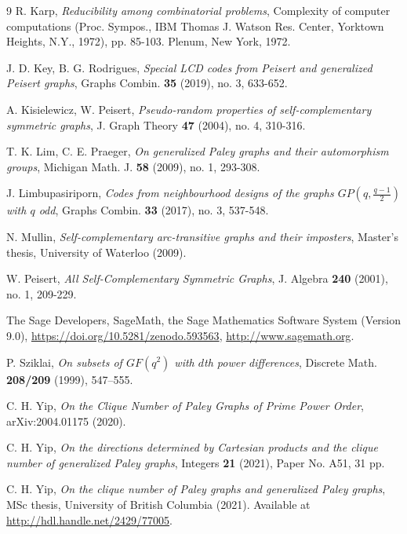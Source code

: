 \documentclass[12pt,oneside]{amsart}
\begin{document}
\begin{thebibliography}{9}
R. Karp,
\emph{Reducibility among combinatorial problems},
Complexity of computer computations (Proc. Sympos., IBM Thomas J. Watson Res. Center, Yorktown Heights, N.Y., 1972), pp. 85-103. Plenum, New York, 1972.

J. D. Key, B. G. Rodrigues,
\emph{Special LCD codes from Peisert and generalized Peisert graphs},
Graphs Combin. \textbf{35} (2019), no. 3, 633-652. 

A. Kisielewicz, W. Peisert,
\emph{Pseudo-random properties of self-complementary symmetric graphs},
J. Graph Theory \textbf{47} (2004), no. 4, 310-316.

T. K. Lim, C. E. Praeger,
\emph{On generalized Paley graphs and their automorphism groups},
Michigan Math. J. \textbf{58} (2009), no. 1, 293-308. 

J. Limbupasiriporn, 
\emph{Codes from neighbourhood designs of the graphs $GP(q,\frac{q-1}{2})$ with $q$ odd}, 
Graphs Combin. \textbf{33} (2017), no. 3, 537-548. 

N. Mullin,
\emph{Self-complementary arc-transitive graphs and their imposters}, 
Master's thesis, University of Waterloo (2009).

W. Peisert,
\emph{All Self-Complementary Symmetric Graphs},
J. Algebra \textbf{240} (2001), no. 1, 209-229.

The Sage Developers, SageMath, the Sage Mathematics Software System (Version 9.0), \url{https://doi.org/10.5281/zenodo.593563}, \url{http://www.sagemath.org}.

P. Sziklai, 
\emph{On subsets of $GF(q^2)$ with $d$th power differences},
Discrete Math. \textbf{208/209} (1999), 547–555. 

C. H. Yip,
\emph{On the Clique Number of Paley Graphs of Prime Power Order}, 
arXiv:2004.01175 (2020).

C. H. Yip,
\emph{On the directions determined by Cartesian products and the clique number of generalized Paley graphs}, 
Integers \textbf{21} (2021), Paper No. A51, 31 pp.

C. H. Yip,
\emph{On the clique number of Paley graphs and generalized Paley graphs},
MSc thesis, University of British Columbia (2021). Available at \url{http://hdl.handle.net/2429/77005}.





\end{thebibliography}
\end{document}
